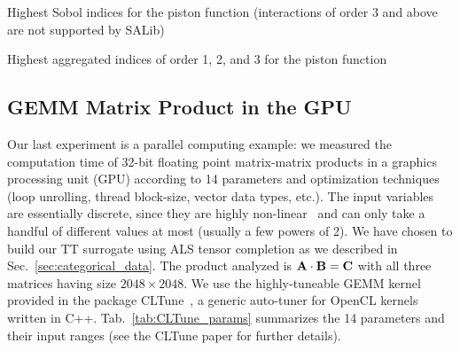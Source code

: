\documentclass[review, twocolumn]{svjour3}          %
\begin{document}
\begin{table*}[h]
	\centering
	\caption{Highest Sobol indices for the piston function (interactions of order 3 and above are not supported by SALib)}
	
	\label{tab:Piston1}
\end{table*}

\begin{table*}[h]
	\centering
	\caption{Highest aggregated indices of order 1, 2, and 3 for the piston function}
	
	\label{tab:Piston2}
\end{table*}

\subsection{GEMM Matrix Product in the GPU} \label{sec:gemm}

Our last experiment is a parallel computing example: we measured the computation time of 32-bit floating point matrix-matrix products in a graphics processing unit (GPU) according to 14 parameters and optimization techniques (loop unrolling, thread block-size, vector data types, etc.). The input variables are essentially discrete, since they are highly non-linear~\cite{NC:15} and can only take a handful of different values at most (usually a few powers of 2). We have chosen to build our TT surrogate using ALS tensor completion as we described in Sec.~\ref{sec:categorical_data}. The product analyzed is $\mathbf{A} \cdot \mathbf{B} = \mathbf{C}$ with all three matrices having size $2048 \times 2048$. We use the highly-tuneable GEMM kernel provided in the package CLTune~\cite{NC:15}, a generic auto-tuner for OpenCL kernels written in C++. Tab.~\ref{tab:CLTune_params} summarizes the 14 parameters and their input ranges (see the CLTune paper for further details). 
\end{document}
